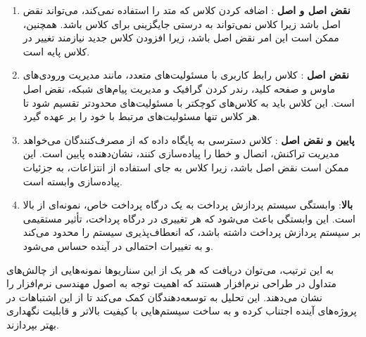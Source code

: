 \begin{enumerate}
	\item \textbf{نقض اصل  و اصل }: اضافه کردن کلاس  که متد  را استفاده نمی‌کند، می‌تواند نقض اصل  باشد زیرا کلاس  نمی‌تواند به درستی جایگزینی برای کلاس  باشد. همچنین، ممکن است این امر نقض اصل  باشد، زیرا افزودن کلاس جدید نیازمند تغییر در کلاس پایه است.
	
	\item \textbf{نقض اصل }: کلاس رابط کاربری با مسئولیت‌های متعدد، مانند مدیریت ورودی‌های ماوس و صفحه کلید، رندر کردن گرافیک و مدیریت پیام‌های شبکه، نقض اصل  است. این کلاس باید به کلاس‌های کوچکتر با مسئولیت‌های محدودتر تقسیم شود تا هر کلاس تنها مسئولیت‌های مرتبط با خود را بر عهده گیرد.
	
	\item \textbf{ پایین و نقض اصل }: کلاس دسترسی به پایگاه داده که از مصرف‌کنندگان می‌خواهد مدیریت تراکنش، اتصال و خطا را پیاده‌سازی کنند، نشان‌دهنده  پایین است. این ممکن است نقض اصل  باشد، زیرا کلاس به جای استفاده از انتزاعات، به جزئیات پیاده‌سازی وابسته است.
	
	\item \textbf{ بالا}: وابستگی سیستم پردازش پرداخت به یک درگاه پرداخت خاص، نمونه‌ای از  بالا است. این وابستگی باعث می‌شود که هر تغییری در درگاه پرداخت، تأثیر مستقیمی بر سیستم پردازش پرداخت داشته باشد، که انعطاف‌پذیری سیستم را محدود می‌کند و به تغییرات احتمالی در آینده حساس می‌شود.
\end{enumerate}

به این ترتیب، می‌توان دریافت که هر یک از این سناریوها نمونه‌هایی از چالش‌های متداول در طراحی نرم‌افزار هستند که اهمیت توجه به اصول مهندسی نرم‌افزار را نشان می‌دهند. این تحلیل به توسعه‌دهندگان کمک می‌کند تا از این اشتباهات در پروژه‌های آینده اجتناب کرده و به ساخت سیستم‌هایی با کیفیت بالاتر و قابلیت نگهداری بهتر بپردازند.